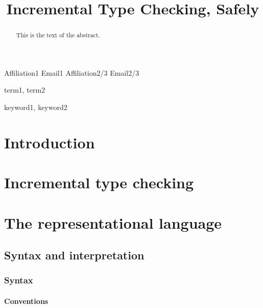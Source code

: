 \documentclass[preprint,9pt,authoryear]{sigplanconf}
\begin{document}
\copyrightdata{[to be supplied]} 


\title{Incremental Type Checking, Safely}

           {Affiliation1}
           {Email1}
           {Affiliation2/3}
           {Email2/3}

\maketitle

\begin{abstract}
This is the text of the abstract.
\end{abstract}


\terms
term1, term2

\keywords
keyword1, keyword2

\section{Introduction}

\section{Incremental type checking}

\section{The {\system} representational language}

\subsection{Syntax and interpretation}

\subsubsection{Syntax}

\paragraph{Conventions} 
\end{document}

